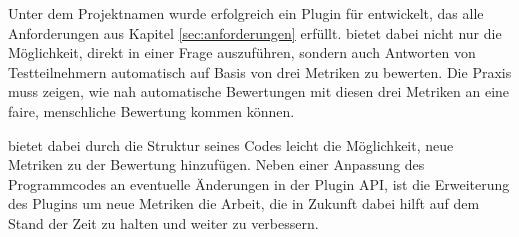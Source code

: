 Unter dem Projektnamen  wurde erfolgreich ein Plugin für  entwickelt, das alle Anforderungen aus Kapitel \ref{sec:anforderungen} erfüllt.  bietet dabei nicht nur die Möglichkeit,  direkt in einer Frage auszuführen, sondern auch Antworten von Testteilnehmern automatisch auf Basis von drei Metriken zu bewerten. Die Praxis muss zeigen, wie nah automatische Bewertungen mit diesen drei Metriken an eine faire, menschliche Bewertung kommen können.

 bietet dabei durch die Struktur seines Codes leicht die Möglichkeit, neue Metriken zu der Bewertung hinzufügen. Neben einer Anpassung des Programmcodes an eventuelle Änderungen in der  Plugin API, ist die Erweiterung des Plugins um neue Metriken die Arbeit, die in Zukunft dabei hilft  auf dem Stand der Zeit zu halten und weiter zu verbessern.
